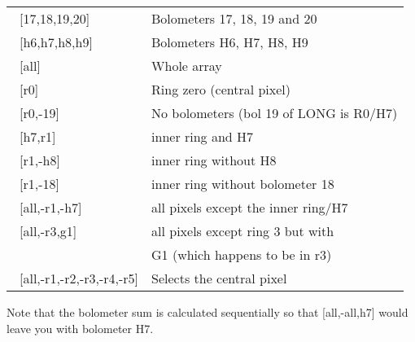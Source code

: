 \documentclass[twoside,11pt]{article}
\begin{document}
{{{\begin{tabular}{ll}
 \ [17,18,19,20]  &                  Bolometers 17, 18, 19 and 20\\
 \ [h6,h7,h8,h9]  &                  Bolometers H6, H7, H8, H9 \\
 \ [all]          &                  Whole array \\
 \ [r0]           &                  Ring zero (central pixel)\\
 \ [r0,-19]       &                  No bolometers (bol 19 of LONG is R0/H7)\\
 \ [h7,r1]        &                  inner ring and H7\\
 \ [r1,-h8]       &                  inner ring without H8\\
 \ [r1,-18]       &                  inner ring without bolometer 18\\
 \ [all,-r1,-h7]  &                  all pixels except the inner ring/H7\\
 \ [all,-r3,g1]   &                  all pixels except ring 3 but with\\
   &                                      G1 (which happens to be in r3)\\
 \ [all,-r1,-r2,-r3,-r4,-r5]  &      Selects the central pixel \\            

 \end{tabular}

Note that the bolometer sum is calculated sequentially so that [all,-all,h7]
would leave you with bolometer H7.

      }
      }}
\end{document}
